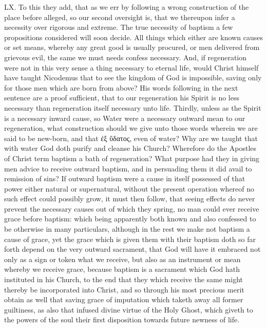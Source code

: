 LX. To this they add, that as we err by following a wrong construction of the place before alleged, so our second oversight is, that we thereupon infer a necessity over rigorous and extreme.
The true necessity of baptism a few propositions considered will soon decide. All things which either are known causes or set means, whereby any great good is usually procured, or men delivered from grievous evil, the same we must needs confess necessary. And, if regeneration were not in this very  sense a thing necessary to eternal life, would Christ himself have taught Nicodemus that to see the kingdom of God is impossible, saving only for those men which are born from above?
His words following in the next sentence are a proof sufficient, that to our regeneration his Spirit is no less necessary than regeneration itself necessary unto life.
Thirdly, unless as the Spirit is a necessary inward cause, so Water were a necessary outward mean to our regeneration, what construction should we give unto those words wherein we are said to be new-born, and that ἐξ ὕδατος, even of water? Why are we taught that with water God doth purify and cleanse his Church? Wherefore do the Apostles of Christ term baptism a bath of regeneration? What purpose had they in giving men advice to receive outward baptism, and in persuading them it did avail to remission of sins?
If outward baptism were a cause in itself possessed of that power either natural or supernatural, without the present operation whereof no such effect could possibly grow, it must then follow, that seeing effects do never prevent the necessary causes out of which they spring, no man could ever receive grace before baptism: which being apparently both known and also confessed to be otherwise in many particulars, although in the rest we make not baptism a cause of grace, yet the grace which is given them with their baptism doth so far forth depend on the very outward sacrament, that God will have it embraced not only as a sign or token what we receive, but also as an instrument or mean whereby we receive grace, because baptism is a sacrament which God hath instituted in his Church, to the end that they which receive the same might thereby be incorporated into Christ, and so through his most precious merit obtain as well that saving grace of imputation which taketh away all former guiltiness,  as also that infused divine virtue of the Holy Ghost, which giveth to the powers of the soul their first disposition towards future newness of life.
